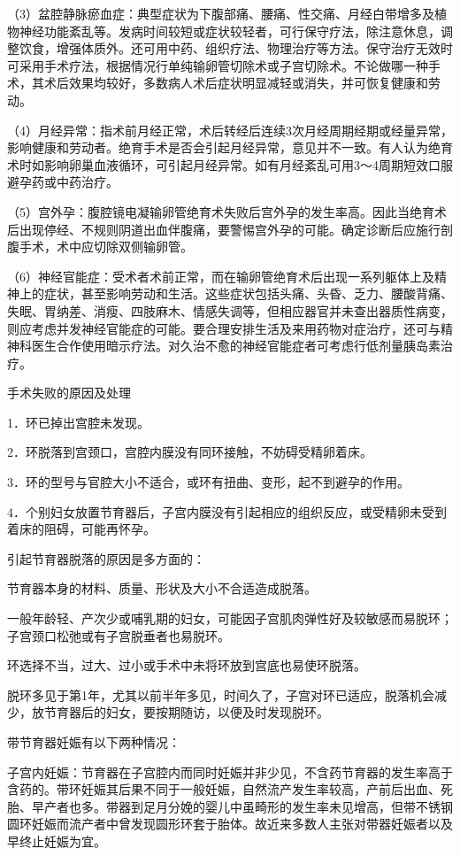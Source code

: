 \documentclass[12pt,UTF8]{ctexbook}
\begin{document}
（3）盆腔静脉瘀血症：典型症状为下腹部痛、腰痛、性交痛、月经白带增多及植物神经功能紊乱等。发病时间较短或症状较轻者，可行保守疗法，除注意休息，调整饮食，增强体质外。还可用中药、组织疗法、物理治疗等方法。保守治疗无效时可采用手术疗法，根据情况行单纯输卵管切除术或子宫切除术。不论做哪一种手术，其术后效果均较好，多数病人术后症状明显减轻或消失，并可恢复健康和劳动。

（4）月经异常：指术前月经正常，术后转经后连续3次月经周期经期或经量异常，影响健康和劳动者。绝育手术是否会引起月经异常，意见并不一致。有人认为绝育术时如影响卵巢血液循环，可引起月经异常。如有月经紊乱可用3～4周期短效口服避孕药或中药治疗。

（5）宫外孕：腹腔镜电凝输卵管绝育术失败后宫外孕的发生率高。因此当绝育术后出现停经、不规则阴道出血伴腹痛，要警惕宫外孕的可能。确定诊断后应施行剖腹手术，术中应切除双侧输卵管。

（6）神经官能症：受术者术前正常，而在输卵管绝育术后出现一系列躯体上及精神上的症状，甚至影响劳动和生活。这些症状包括头痛、头昏、乏力、腰酸背痛、失眠、胃纳差、消瘦、四肢麻木、情感失调等，但相应器官并未查出器质性病变，则应考虑并发神经官能症的可能。要合理安排生活及来用药物对症治疗，还可与精神科医生合作使用暗示疗法。对久治不愈的神经官能症者可考虑行低剂量胰岛素治疗。





手术失败的原因及处理


1．环已掉出宫腔未发现。

2．环脱落到宫颈口，宫腔内膜没有同环接触，不妨碍受精卵着床。

3．环的型号与官腔大小不适合，或环有扭曲、变形，起不到避孕的作用。

4．个别妇女放置节育器后，子宫内膜没有引起相应的组织反应，或受精卵未受到着床的阻碍，可能再怀孕。

引起节育器脱落的原因是多方面的：

节育器本身的材料、质量、形状及大小不合适造成脱落。

一般年龄轻、产次少或哺乳期的妇女，可能因子宫肌肉弹性好及较敏感而易脱环；子宫颈口松弛或有子宫脱垂者也易脱环。

环选择不当，过大、过小或手术中未将环放到宫底也易使环脱落。

脱环多见于第1年，尤其以前半年多见，时间久了，子宫对环已适应，脱落机会减少，放节育器后的妇女，要按期随访，以便及时发现脱环。

带节育器妊娠有以下两种情况：

子宫内妊娠：节育器在子宫腔内而同时妊娠并非少见，不含药节育器的发生率高于含药的。带环妊娠其后果不同于一般妊娠，自然流产发生率较高，产前后出血、死胎、早产者也多。带器到足月分娩的婴儿中虽畸形的发生率未见增高，但带不锈钢圆环妊娠而流产者中曾发现圆形环套于胎体。故近来多数人主张对带器妊娠者以及早终止妊娠为宜。
\end{document}
